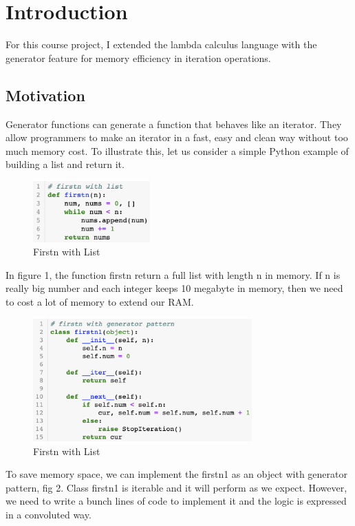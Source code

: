 
\section{Introduction}
For this course project, I extended the lambda calculus language with the generator feature for memory efficiency in iteration operations.

\subsection{Motivation}
Generator functions can generate a function that behaves like an iterator. They allow programmers to make an iterator in a fast, easy and clean way without too much memory cost. To illustrate this, let us consider a simple Python example of building a list and return it\cite{generators}.
\begin{figure}[H]
	\centering
	\includegraphics[width=0.4\textwidth]{figures/fstn}
	\caption{Firstn with List}
\end{figure}
In figure 1, the function firstn return a full list with length n in memory. If n is really big number and each integer keeps 10 megabyte in memory, then we need to cost a lot of memory to extend our RAM.
%
\begin{figure}[H]
	\centering
	\includegraphics[width=0.75\textwidth]{figures/fstn1}
	\caption{Firstn with List}
\end{figure}
%
To save memory space, we can implement the firstn1 as an object with generator pattern, fig 2. Class firstn1 is iterable and it will perform as we expect. However, we need to write a bunch lines of code to implement it and the logic is expressed in a convoluted way.

